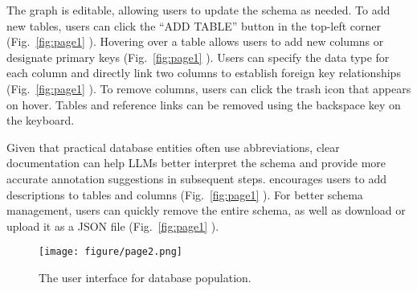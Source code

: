 The graph is editable, allowing users to update the schema as needed. To add new tables, users can click the ``ADD TABLE'' button in the top-left corner (Fig.~\ref{fig:page1} ). Hovering over a table allows users to add new columns or designate primary keys (Fig.~\ref{fig:page1} ).
Users can specify the data type for each column and directly link two columns to establish foreign key relationships (Fig.~\ref{fig:page1} ). To remove columns, users can click the trash icon that appears on hover. 
Tables and reference links can be removed using the backspace key on the keyboard.

Given that practical database entities often use abbreviations, clear documentation can help LLMs better interpret the schema and provide more accurate annotation suggestions in subsequent steps. {\tool} encourages users to add descriptions to tables and columns (Fig.~\ref{fig:page1} ).
For better schema management, users can quickly remove the entire schema, as well as download or upload it as a JSON file (Fig.~\ref{fig:page1} ).




\begin{figure*}[ht]
  \centering
  \texttt{[image: figure/page2.png]}
  \caption{The user interface for database population. }
  \label{fig:page2}
\end{figure*}

